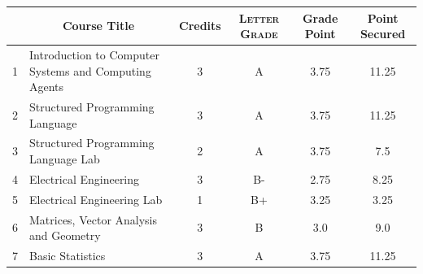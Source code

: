 \documentclass[11pt]{article}
\newcommand*{\numtwo}[1]{\pgfmathprintnumber[
                    fixed, precision=2, fixed zerofill=true]{#1}}
\begin{document}
                \begin{center}
                    \renewcommand{\arraystretch}{1.08}
                    
                \begin{tabular}{|c|l|c|>{\scshape}c|c|c|}
                \hline  \rule[-1ex]{0pt}{3.5ex} {\centering{\bf Course Code}} &  \multicolumn{1}{c|}{\textbf{Course Title}}  & {\bf Credits} & {\bf Letter Grade} & {\bf Grade Point} & {\bf Point Secured}  \\ 
                \hline   1 &  Introduction to Computer Systems and Computing Agents		 & 3 & A & 3.75 & 11.25 \\ %
                \hline   2 &  Structured Programming Language		 & 3 & A & 3.75 & 11.25 \\ %
                \hline   3 &  Structured Programming Language Lab		 & 2 & A & 3.75 & 7.5 \\ %
                \hline   4 &  Electrical Engineering		 & 3 & B- & 2.75 & 8.25 \\ %
                \hline   5 &  Electrical Engineering Lab		 & 1 & B+ & 3.25 & 3.25 \\ %
                \hline   6 &  Matrices, Vector Analysis and Geometry		 & 3 & B & 3.0 & 9.0 \\ %
                \hline   7 &  Basic Statistics		 & 3 & A & 3.75 & 11.25 \\ %

\hline                %
                \end{tabular}
                \end{center}
                \renewcommand{\arraystretch}{1.03}
\end{document}
